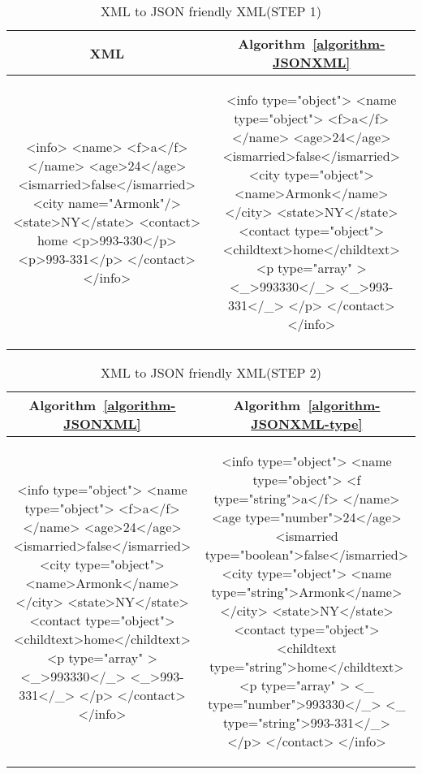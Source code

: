 \begin{longtable}{c|c}
	\caption{XML to JSON friendly XML(STEP 1)}
	\label{tbl:xmljson}\\
	\textbf{XML} & \textbf{ Algorithm~\ref{algorithm-JSONXML} }\\
	\hline
\begin{minipage}{.4\textwidth}
\begin{fakeXML}
<info>
  <name>
    <f>a</f>
  </name>
  <age>24</age>
  <ismarried>false</ismarried>
  <city name="Armonk"/>
  <state>NY</state>
  <contact>
	 home
    <p>993-330</p>
    <p>993-331</p>
  </contact>
</info>
\end{fakeXML}	
\end{minipage} &
\begin{minipage}{.55\textwidth}
\begin{fakeXML}
<info type="object">
  <name type="object">
    <f>a</f>
  </name>
  <age>24</age>
  <ismarried>false</ismarried>
  <city type="object">
    <name>Armonk</name>
  </city>
  <state>NY</state>
  <contact type="object">
	<childtext>home</childtext>
    <p  type="array" >
	   <_>993330</_>
	   <_>993-331</_>
    </p>
  </contact>
</info>
\end{fakeXML}
\end{minipage}\\
\end{longtable}

\begin{longtable}{c|c}
	\caption{XML to JSON friendly XML(STEP 2)}
	\label{tbl:xmljson-2}\\
	\textbf{Algorithm~\ref{algorithm-JSONXML}} & \textbf{ Algorithm~\ref{algorithm-JSONXML-type} }\\
	\hline
\begin{minipage}{.4\textwidth}
\begin{fakeXML}
<info type="object">
  <name type="object">
    <f>a</f>
  </name>
  <age>24</age>
  <ismarried>false</ismarried>
  <city type="object">
    <name>Armonk</name>
  </city>
  <state>NY</state>
  <contact type="object">
	 <childtext>home</childtext>
    <p  type="array" >
	   <_>993330</_>
	   <_>993-331</_>
    </p>
  </contact>
</info>
\end{fakeXML}	
\end{minipage} &
\begin{minipage}{.55\textwidth}
\begin{fakeXML}
<info type="object">
  <name type="object">
    <f type="string">a</f>
  </name>
  <age type="number">24</age>
  <ismarried type="boolean">false</ismarried>
  <city type="object">
    <name type="string">Armonk</name>
  </city>
  <state>NY</state>
  <contact type="object">
	 <childtext type="string">home</childtext>
    <p  type="array" >
	   <_ type="number">993330</_>
	   <_ type="string">993-331</_>
    </p>
  </contact>
</info>
\end{fakeXML}
\end{minipage}\\
\end{longtable}


